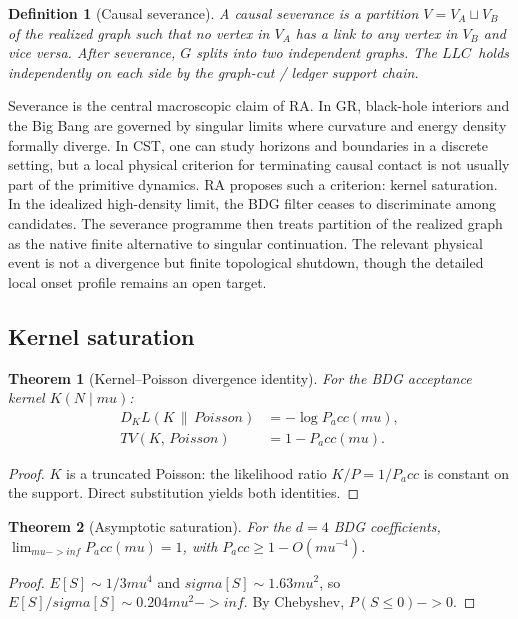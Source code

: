\documentclass[11pt]{article}
\def\sigma{sigma}%
\def\mu{mu}%
\def\mathrm#1{#1}%
\def\mathbf#1{#1}%
\def\mathbb#1{#1}%
\def\frac#1#2{#1/#2}%
\def\to{->}%
\def\infty{inf}%
\def\Pacc{P_acc}%
\def\Dkl{D_KL}%
\def\TV{TV}%
\newtheorem{definition}{Definition}
\newtheorem{theorem}{Theorem}
\newcommand{\LLC}{\ensuremath{\mathrm{LLC}}}
\newcommand{\Pacc}{\ensuremath{P_{\mathrm{acc}}}}
\newcommand{\Dkl}{\ensuremath{D_{\mathrm{KL}}}}
\newcommand{\TV}{\ensuremath{\mathrm{TV}}}
\begin{document}
\begin{definition}[Causal severance]
A \emph{causal severance} is a partition $V=V_A\sqcup V_B$ of the realized graph such that no vertex in $V_A$ has a link to any vertex in $V_B$ and vice versa. After severance, $G$ splits into two independent graphs. The \LLC\ holds independently on each side by the graph-cut / ledger support chain.
\end{definition}

Severance is the central macroscopic claim of RA. In GR, black-hole interiors and the Big Bang are governed by singular limits where curvature and energy density formally diverge. In CST, one can study horizons and boundaries in a discrete setting, but a local physical criterion for terminating causal contact is not usually part of the primitive dynamics. RA proposes such a criterion: kernel saturation. In the idealized high-density limit, the BDG filter ceases to discriminate among candidates. The severance programme then treats partition of the realized graph as the native finite alternative to singular continuation. The relevant physical event is not a divergence but finite topological shutdown, though the detailed local onset profile remains an open target.

\subsection{Kernel saturation}

\begin{theorem}[Kernel--Poisson divergence identity]
\label{thm:kl}
For the BDG acceptance kernel $K(\mathbf{N}\mid \mu)$:
\begin{align}
\Dkl(K\,\|\,\mathrm{Poisson}) &= -\log\Pacc(\mu), \\
\TV(K,\,\mathrm{Poisson}) &= 1-\Pacc(\mu).
\end{align}
\end{theorem}
\begin{proof}
$K$ is a truncated Poisson: the likelihood ratio $K/P=1/\Pacc$ is constant on the support. Direct substitution yields both identities.
\end{proof}

\begin{theorem}[Asymptotic saturation]
\label{thm:saturation}
For the $d=4$ BDG coefficients, $\lim_{\mu\to\infty}\Pacc(\mu)=1$, with $\Pacc\ge 1-O(\mu^{-4})$.
\end{theorem}
\begin{proof}
$\mathbb{E}[S]\sim\frac{1}{3}\mu^4$ and $\sigma[S]\sim 1.63\mu^2$, so $\mathbb{E}[S]/\sigma[S]\sim 0.204\mu^2\to\infty$. By Chebyshev, $\mathbb{P}(S\le 0)\to 0$.
\end{proof}
\end{document}
